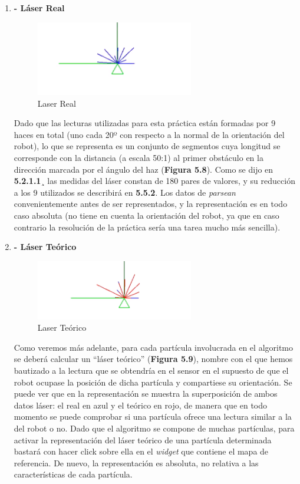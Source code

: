 \begin{enumerate}
	\item \textbf{- Láser Real}
	\begin{figure}[H]
		\begin{center}
			\includegraphics[width=0.65\textwidth]{figures/laserreal.png}
			\caption{Laser Real}
			\label{fig.laserreal}
			\end{center}
	\end{figure}
Dado que las lecturas utilizadas para esta práctica están formadas por 9 haces en total (uno cada 20º con respecto a la normal de la orientación del robot), lo que se representa es un conjunto de segmentos cuya longitud se corresponde con la distancia (a escala 50:1) al primer obstáculo en la dirección marcada por el ángulo del haz (\textbf{Figura 5.8}). Como se dijo en \textbf{5.2.1.1}¸ las medidas del láser constan de 180 pares de valores, y su reducción a los 9 utilizados se describirá en \textbf{5.5.2}. Los datos de \textit{parsean} convenientemente antes de ser representados, y la representación es en todo caso absoluta (no tiene en cuenta la orientación del robot, ya que en caso contrario la resolución de la práctica sería una tarea mucho más sencilla).
\item \textbf{- Láser Teórico}
	\begin{figure}[H]
		\begin{center}
			\includegraphics[width=0.65\textwidth]{figures/laserteorico.png}
			\caption{Laser Teórico}
			\label{fig.laserteorico}
			\end{center}
	\end{figure}
Como veremos más adelante, para cada partícula involucrada en el algoritmo se deberá calcular un “láser teórico” (\textbf{Figura 5.9}), nombre con el que hemos bautizado a la lectura que se obtendría en el sensor en el supuesto de que el robot ocupase la posición de dicha partícula y compartiese su orientación. Se puede ver que en la representación se muestra la superposición de ambos datos láser: el real en azul y el teórico en rojo, de manera que en todo momento se puede comprobar si una partícula ofrece una lectura similar a la del robot o no. Dado que el algoritmo se compone de muchas partículas, para activar la representación del láser teórico de una partícula determinada bastará con hacer click sobre ella en el \textit{widget} que contiene el mapa de referencia. De nuevo, la representación es absoluta, no relativa a las características de cada partícula.

\end{enumerate}
